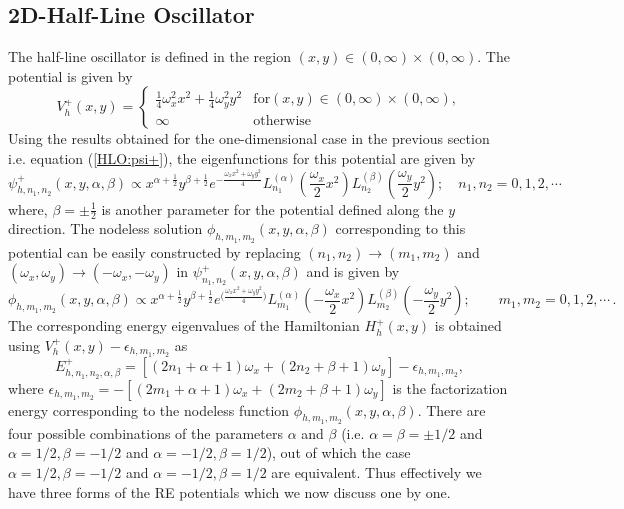 \documentclass[12pt]{article}
\numberwithin{equation}{section} %
\begin{document}
\subsection{2D-Half-Line Oscillator}
The half-line oscillator is defined in the region \((x,y) \in (0,\infty) \times
(0,\infty)\). The potential is given by
\[ V^+_h(x,y) = 
 \begin{cases} 
 \frac{1}{4}\omega_x^2 x^2 + \frac{1}{4}\omega_y^2 y^2 & \text{for} (x,y) \in (0,\infty) \times (0,\infty), \\
 \infty & \text{otherwise}
 \end{cases}
\]
 Using the results obtained for the one-dimensional case in the previous 
 section i.e. equation (\ref{HLO:psi+}), the eigenfunctions for this potential 
 are given by
\begin{equation}\label{2DHLO:psi+}
    \psi_{h,n_1,n_2}^+(x,y,\alpha,\beta)\propto  x^{\alpha +\frac{1}{2}}y^{\beta +\frac{1}{2}} e^{-\frac{\omega_xx^2+\omega_y y^2}{4}} L_{n_1}^{(\alpha) }\left(\frac{\omega_x}{2} x^2\right)L_{n_2}^{(\beta)}\left(\frac{\omega_y}{2} y^2\right); \quad n_1, n_2=0,1,2,\cdots
\end{equation} 
where, $\beta=\pm\frac{1}{2}$ is another parameter for the potential defined 
along the $y$ direction. The nodeless solution 	
$\phi_{h,m_1,m_2}(x,y,\alpha,\beta)$ corresponding to this potential can be 
easily constructed by replacing $(n_1,n_2)\rightarrow (m_1,m_2)$ and 
$(\omega_x,\omega_y)\rightarrow (-\omega_x, -\omega_y)$ in 
$\psi_{n_1,n_2}^+(x,y,\alpha,\beta)$ and is given by
\begin{equation}\label{2DHLO:phi}
    \phi_{h, m_1,m_2}(x,y,\alpha,\beta)\propto x^{\alpha +\frac{1}{2}}y^{\beta +\frac{1}{2}} e^{\big(\frac{\omega_x x^2+\omega_y y^2}{4}\big)} 
L_{m_1}^{(\alpha)}\left(-\frac{\omega_x}{2} x^2\right)L_{m_2}^{(\beta)}\left(-\frac{\omega_y}{2}  y^2\right); \qquad m_1,m_2=0,1,2,\cdots \,.
\end{equation}
The corresponding energy eigenvalues of the Hamiltonian $H_h^+(x,y)$ is obtained using
$V^+_h(x,y)-\epsilon_{h,m_1,m_2}$ as
\begin{equation}\label{2DHLO:E+}
    E^+_{h,n_1,n_2,\alpha,\beta}=[(2n_1+\alpha+1)\omega_x+(2n_2+\beta+1)\omega_y]-\epsilon_{h,m_1,m_2},
\end{equation}
where $\epsilon_{h,m_1,m_2}=-[(2m_1+\alpha+1)\omega_x+(2m_2+\beta+1)\omega_y]$ 
is the factorization energy corresponding to the nodeless function $\phi_{h,m_1,m_2}(x,y,\alpha,\beta)$. There are four possible combinations of the parameters
$\alpha$ and $\beta$ (i.e. $\alpha=\beta=\pm 1/2$ and $\alpha=1/2, \beta=-1/2$ 
and $\alpha=-1/2, \beta= 1/2$), out of which the case $\alpha=1/2, \beta=-1/2$ 
and $\alpha=-1/2, \beta=1/2$ are equivalent. Thus effectively we have three 
forms of the RE potentials which we now discuss one by one. 
\end{document}
